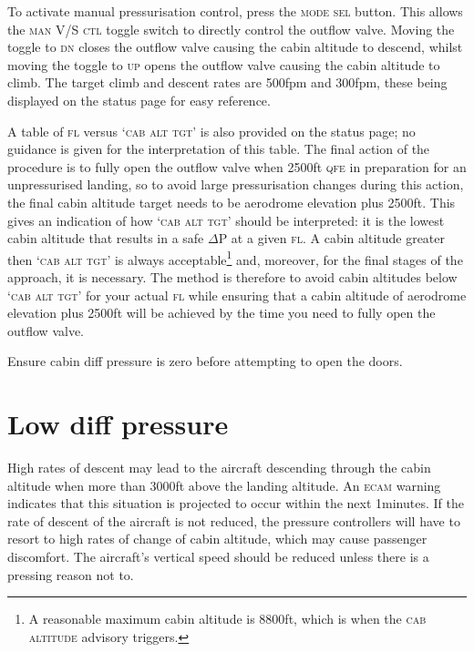\documentclass[a5paper,11pt,twoside]{book}
\newcommand{\ac}[1]{{\scshape\MakeLowercase{#1}}}
\newcommand{\inlcite}[1]{{\ac{#1}}}
\newcommand{\multicite}[1]{%
  \nopagebreak
  \noindent{{\color{blue}\footnotesize[\inlcite{#1}]}}
}
\begin{document}
To activate manual pressurisation control, press
the \ac{MODE} \ac{SEL} button. This
allows the \ac{MAN} V/S \ac{CTL} toggle switch to directly control the outflow
valve. Moving the toggle to \ac{DN} closes the outflow valve causing the cabin
altitude to descend, whilst moving the toggle to \ac{UP} opens the outflow valve
causing the cabin altitude to climb. The target climb and descent rates are
500fpm and 300fpm, these being displayed on the status page for easy reference.

A table of \ac{FL} versus `\ac{CAB} \ac{ALT} \ac{TGT}' is also provided on the status page; no
guidance is given for the interpretation of this table. The final action of the
procedure is to fully open the outflow valve when 2500ft \ac{QFE} in preparation for
an unpressurised landing, so to avoid large pressurisation changes during this
action, the final cabin altitude target needs to be aerodrome elevation plus
2500ft. This gives an indication of how `\ac{CAB} \ac{ALT} \ac{TGT}' should be interpreted: it
is the lowest cabin altitude that results in a safe $\Delta$P at a given \ac{FL}. A
cabin altitude greater then `\ac{CAB} \ac{ALT} \ac{TGT}' is always acceptable\footnote{A
reasonable maximum cabin altitude is 8800ft, which is when the \ac{CAB} \ac{ALTITUDE}
advisory triggers.} and, moreover, for the final stages of the approach, it is
necessary. The method is therefore to avoid cabin altitudes below `\ac{CAB} \ac{ALT} \ac{TGT}'
for your actual \ac{FL} while ensuring that a cabin altitude of aerodrome elevation
plus 2500ft will be achieved by the time you need to fully open the outflow
valve.

Ensure cabin diff pressure is zero before attempting to open the doors.

\multicite{\uline{CAB~PR}~SYS~1(2)(1+2)~FAULT, FCOM~PRO.AEP.CAB~PR}


\section{Low diff pressure}

High rates of descent may lead to the aircraft descending through the cabin
altitude when more than 3000ft above the landing altitude. An \ac{ECAM} warning
indicates that this situation is projected to occur within the next
1\textonehalf minutes. If the rate of descent of the aircraft is not reduced,
the pressure controllers will have to resort to high rates of change of cabin
altitude, which may cause passenger discomfort. The aircraft's vertical speed
should be reduced unless there is a pressing reason not to.
\end{document}
